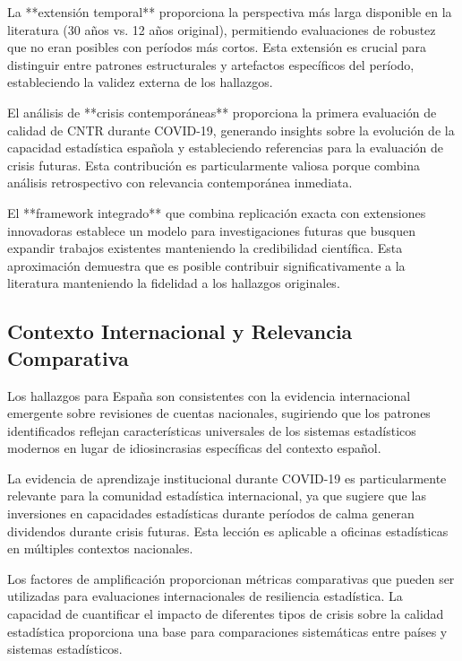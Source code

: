 \documentclass[12pt,a4paper]{article}
\begin{document}
La **extensión temporal** proporciona la perspectiva más larga disponible en la literatura (30 años vs. 12 años original), permitiendo evaluaciones de robustez que no eran posibles con períodos más cortos. Esta extensión es crucial para distinguir entre patrones estructurales y artefactos específicos del período, estableciendo la validez externa de los hallazgos.

El análisis de **crisis contemporáneas** proporciona la primera evaluación de calidad de CNTR durante COVID-19, generando insights sobre la evolución de la capacidad estadística española y estableciendo referencias para la evaluación de crisis futuras. Esta contribución es particularmente valiosa porque combina análisis retrospectivo con relevancia contemporánea inmediata.

El **framework integrado** que combina replicación exacta con extensiones innovadoras establece un modelo para investigaciones futuras que busquen expandir trabajos existentes manteniendo la credibilidad científica. Esta aproximación demuestra que es posible contribuir significativamente a la literatura manteniendo la fidelidad a los hallazgos originales.

\subsection{Contexto Internacional y Relevancia Comparativa}

Los hallazgos para España son consistentes con la evidencia internacional emergente sobre revisiones de cuentas nacionales, sugiriendo que los patrones identificados reflejan características universales de los sistemas estadísticos modernos en lugar de idiosincrasias específicas del contexto español.

La evidencia de aprendizaje institucional durante COVID-19 es particularmente relevante para la comunidad estadística internacional, ya que sugiere que las inversiones en capacidades estadísticas durante períodos de calma generan dividendos durante crisis futuras. Esta lección es aplicable a oficinas estadísticas en múltiples contextos nacionales.

Los factores de amplificación proporcionan métricas comparativas que pueden ser utilizadas para evaluaciones internacionales de resiliencia estadística. La capacidad de cuantificar el impacto de diferentes tipos de crisis sobre la calidad estadística proporciona una base para comparaciones sistemáticas entre países y sistemas estadísticos.
\end{document}
